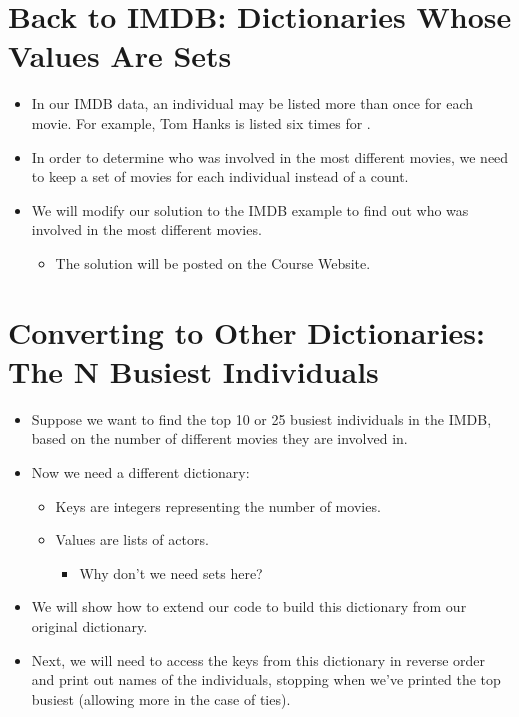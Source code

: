 \documentclass[letterpaper,10pt,english]{sphinxmanual}
\begin{document}
\section{Back to IMDB: Dictionaries Whose Values Are Sets}
\label{\detokenize{lecture_notes/lec17_dictionaries2:back-to-imdb-dictionaries-whose-values-are-sets}}\begin{itemize}
\item {} 
In our IMDB data, an individual may be listed more than once for
each movie. For example, Tom Hanks is listed six times for .

\item {} 
In order to determine who was involved in the most different
movies, we need to keep a set of movies for each individual instead
of a count.

\item {} 
We will modify our solution to the IMDB example to find out who was
involved in the most different movies.
\begin{itemize}
\item {} 
The solution will be posted on the Course Website.

\end{itemize}

\end{itemize}


\section{Converting to Other Dictionaries:  The N Busiest Individuals}
\label{\detokenize{lecture_notes/lec17_dictionaries2:converting-to-other-dictionaries-the-n-busiest-individuals}}\begin{itemize}
\item {} 
Suppose we want to find the top 10 or 25 busiest individuals in the
IMDB, based on the number of different movies they are involved in.

\item {} 
Now we need a different dictionary:
\begin{itemize}
\item {} 
Keys are integers representing the number of movies.

\item {} 
Values are lists of actors.
\begin{itemize}
\item {} 
Why don’t we need sets here?

\end{itemize}

\end{itemize}

\item {} 
We will show how to extend our code to build this dictionary from
our original dictionary.

\item {} 
Next, we will need to access the keys from this dictionary in
reverse order and print out names of the individuals, stopping when
we’ve printed the top  busiest (allowing more in the case of
ties).

\end{itemize}
\end{document}
